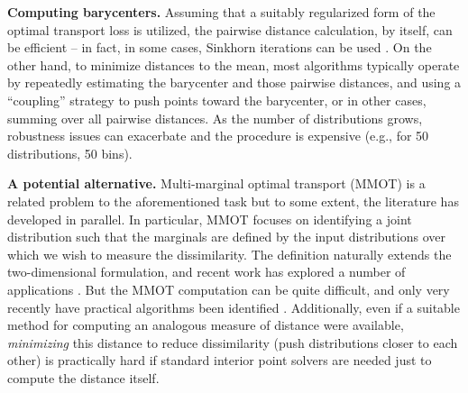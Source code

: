 {\bf Computing barycenters.} 
Assuming that a suitably regularized form of the optimal transport loss is utilized, the pairwise distance 
calculation, by itself, can be efficient -- in fact, 
in some cases, Sinkhorn iterations can be used \citep{cuturi2013sinkhorn}. 
On the other hand, to minimize distances to the mean, 
most algorithms typically operate 
by repeatedly estimating the barycenter and those pairwise distances, and using a ``coupling'' strategy 
to push points toward the barycenter,
or in other cases, summing over all pairwise 
distances. 
As the number of distributions 
grows, robustness issues can exacerbate \citep{alvarez2008trimmed} and the procedure is 
expensive (e.g., for 50 distributions, 50 bins).

{\bf A potential alternative.}
Multi-marginal optimal transport (MMOT) is a related problem to the aforementioned task but to some extent, the literature has developed in parallel.
In particular, MMOT focuses on identifying a joint distribution such that the marginals are defined by the input distributions over which we wish to measure the dissimilarity.
The definition naturally extends the two-dimensional formulation, and recent work has explored a number of applications \citep{pass2015multi}.
But the MMOT computation can be quite difficult,
and only very recently have practical algorithms been identified \citep{mmotcuturi}.
Additionally, even if a suitable method for computing an analogous measure of distance were available, 
\textit{minimizing} this distance to reduce 
dissimilarity (push distributions closer to each other) is practically hard if standard interior point solvers are needed just to compute the distance itself.

